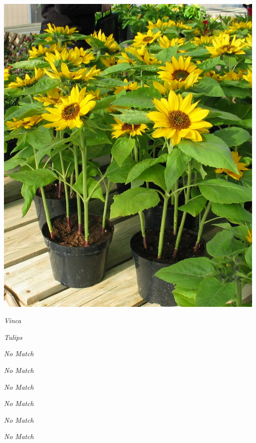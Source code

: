 \documentclass{article}
\begin{document}
\begin{center}
\includegraphics[height=0.9\textheight, angle=90]{../Sunflower_pots.jpg}
\end{center}
\newpage

\noindent
\vfill
\centerline{{\Large\emph{Vinca}}}
\vfill
\newpage

\noindent
\vfill
\centerline{{\Large\emph{Tulips}}}
\vfill
\newpage

\noindent
\vfill
\centerline{{\Large\emph{No Match}}}
\vfill
\newpage

\noindent
\vfill
\centerline{{\Large\emph{No Match}}}
\vfill
\newpage

\noindent
\vfill
\centerline{{\Large\emph{No Match}}}
\vfill
\newpage

\noindent
\vfill
\centerline{{\Large\emph{No Match}}}
\vfill
\newpage

\noindent
\vfill
\centerline{{\Large\emph{No Match}}}
\vfill
\newpage

\noindent
\vfill
\centerline{{\Large\emph{No Match}}}
\vfill
\newpage
\end{document}
